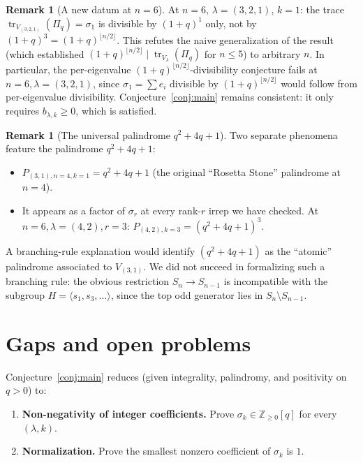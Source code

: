 \documentclass[11pt]{article}
\theoremstyle{definition}
\newtheorem{remark}[theorem]{Remark}
\newcommand{\Pq}{\Pi_q}
\newcommand{\Z}{\mathbb{Z}}
\newcommand{\tr}{\operatorname{tr}}
\begin{document}
\begin{remark}[A new datum at $n=6$]\label{rem:new-datum}
At $n=6$, $\lambda=(3,2,1)$, $k=1$: the trace
$\tr_{V_{(3,2,1)}}(\Pq)=\sigma_1$ is divisible by $(1+q)^1$ only, not by
$(1+q)^3=(1+q)^{\lfloor n/2\rfloor}$. This refutes the naive
generalization of the result~\cite{clio2026milddlefactor} (which
established $(1+q)^{\lfloor n/2\rfloor}\mid\tr_{V_\lambda}(\Pq)$ for
$n\le 5$) to arbitrary $n$. In particular, the per-eigenvalue
$(1+q)^{\lfloor n/2\rfloor}$-divisibility conjecture fails at
$n=6,\lambda=(3,2,1)$, since $\sigma_1=\sum e_i$ divisible by
$(1+q)^{\lfloor n/2\rfloor}$ would follow from per-eigenvalue
divisibility. Conjecture~\ref{conj:main} remains consistent: it only
requires $b_{\lambda,k}\ge 0$, which is satisfied.
\end{remark}

\begin{remark}[The universal palindrome $q^2+4q+1$]
Two separate phenomena feature the palindrome $q^2+4q+1$:
\begin{itemize}
\item $P_{(3,1),n=4,k=1}=q^2+4q+1$ (the original ``Rosetta Stone''
  palindrome at $n=4$).
\item It appears as a factor of $\sigma_r$ at every rank-$r$ irrep we
  have checked. At $n=6,\lambda=(4,2),r=3$: $P_{(4,2),k=3}=(q^2+4q+1)^3$.
\end{itemize}
A branching-rule explanation would identify $(q^2+4q+1)$ as the
``atomic'' palindrome associated to $V_{(3,1)}$. We did not succeed in
formalizing such a branching rule: the obvious restriction $S_n\to
S_{n-1}$ is incompatible with the subgroup $H=\langle s_1,s_3,\ldots
\rangle$, since the top odd generator lies in $S_n\setminus S_{n-1}$.
\end{remark}

\section{Gaps and open problems}

Conjecture~\ref{conj:main} reduces (given integrality, palindromy, and
positivity on $q>0$) to:
\begin{enumerate}
\item[(G1)] \textbf{Non-negativity of integer coefficients.}
  Prove $\sigma_k\in\Z_{\ge 0}[q]$ for every $(\lambda,k)$.
\item[(G2)] \textbf{Normalization.} Prove the smallest nonzero
  coefficient of $\sigma_k$ is $1$.
\end{enumerate}
\end{document}
